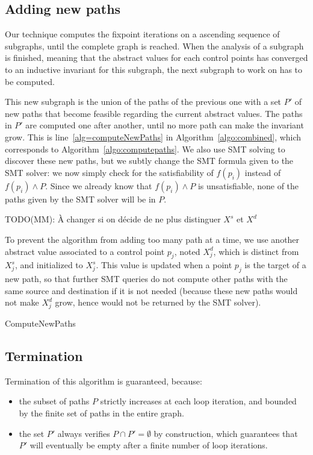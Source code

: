 \documentclass[preprint]{sigplanconf}
\newcommand{\MM}[1]{{\color{blue} TODO(MM): #1}}
\begin{document}
\subsection{Adding new paths}
\label{subsec:addingpaths}

Our technique computes the fixpoint iterations on a ascending sequence of
subgraphs, until the complete graph is reached.
When the analysis of a subgraph is finished, meaning that the abstract values
for each control points has converged to an inductive invariant for this subgraph,
the next subgraph to work on has to be computed.

This new subgraph is the union of the paths of the previous one with a set
$P'$ of new paths that become feasible regarding the current abstract values.
The paths in $P'$ are computed one after another, until no more path
can make the invariant grow. This is line~\ref{alg=computeNewPaths} in
Algorithm~\ref{algo:combined}, which corresponds to
Algorithm~\ref{algo:computepaths}. We also use SMT solving to discover
these new paths, but we subtly change the SMT formula given to the
SMT solver: we now simply check for the satisfiability of $f(p_i)$
instead of $f(p_i) \wedge P$. Since we already know that $f(p_i)
\wedge P$ is unsatisfiable, none of the paths given by the SMT solver
will be in $P$.

\MM{À changer si on décide de ne plus distinguer $X^s$ et $X^d$}

To prevent the algorithm from adding too many path at a time, we
use another abstract value associated to a control point $p_j$, noted
$X_j^d$, which is distinct from $X_j^s$, and initialized to $X_j^s$.
This value is updated when a point $p_j$ is the target of a new path,
so that further SMT queries do not compute other paths with the same
source and destination if it is not needed (because these new paths
would not make $X_j^d$ grow, hence would not be returned by the SMT
solver).

\begin{algorithm}
	\caption{ComputeNewPaths}
	\label{algo:computepaths}
	\begin{algorithmic}[1] 
	
	\end{algorithmic}
\end{algorithm}

\subsection{Termination}
Termination of this algorithm is guaranteed, because:
\begin{itemize}
\item 
the subset of paths $P$ strictly increases at each loop iteration, and bounded by the finite set of
paths in the entire graph. 
\item the set $P'$ always verifies $P \cap P' = \emptyset$ by construction, 
which guarantees that $P'$
will eventually be empty after a finite number of loop iterations.
\end{itemize}
\end{document}
